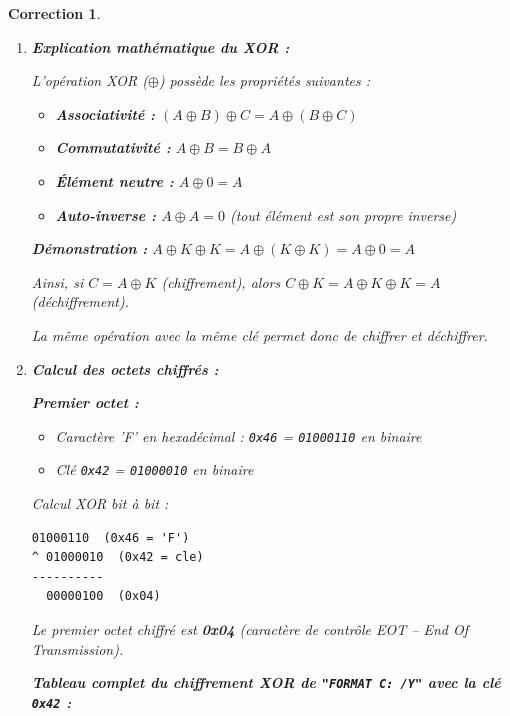 \documentclass[a4paper,11pt]{article}
\theoremstyle{plain}
\newtheorem{correction}{Correction}
\theoremstyle{definition}
\begin{document}
\begin{correction}

\begin{enumerate}
\item \textbf{Explication mathématique du XOR :}

L'opération XOR ($\oplus$) possède les propriétés suivantes :
\begin{itemize}
\item \textbf{Associativité :} $(A \oplus B) \oplus C = A \oplus (B \oplus C)$
\item \textbf{Commutativité :} $A \oplus B = B \oplus A$
\item \textbf{Élément neutre :} $A \oplus 0 = A$
\item \textbf{Auto-inverse :} $A \oplus A = 0$ (tout élément est son propre inverse)
\end{itemize}

\textbf{Démonstration :} $A \oplus K \oplus K = A \oplus (K \oplus K) = A \oplus 0 = A$

Ainsi, si $C = A \oplus K$ (chiffrement), alors $C \oplus K = A \oplus K \oplus K = A$ (déchiffrement).

La même opération avec la même clé permet donc de chiffrer et déchiffrer.

\item \textbf{Calcul des octets chiffrés :}

\textbf{Premier octet :}

\begin{itemize}
\item Caractère 'F' en hexadécimal : \texttt{0x46} = \texttt{01000110} en binaire
\item Clé \texttt{0x42} = \texttt{01000010} en binaire
\end{itemize}

Calcul XOR bit à bit :
\begin{lstlisting}[numbers=none,frame=none,backgroundcolor=\color{white}]
  01000110  (0x46 = 'F')
^ 01000010  (0x42 = cle)
----------
  00000100  (0x04)
\end{lstlisting}

Le premier octet chiffré est \textbf{0x04} (caractère de contrôle EOT -- End Of Transmission).

\medskip
\textbf{Tableau complet du chiffrement XOR de \texttt{"FORMAT C: /Y"} avec la clé \texttt{0x42} :}


\end{enumerate}
\end{correction}
\end{document}
